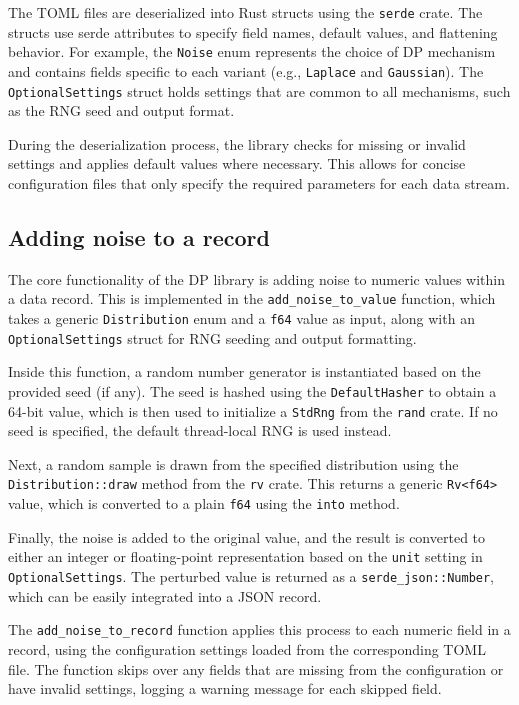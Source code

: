 The TOML files are deserialized into Rust structs using the \texttt{serde} crate. The structs use serde attributes to specify field names, default values, and flattening behavior. For example, the \texttt{Noise} enum represents the choice of DP mechanism and contains fields specific to each variant (e.g., \texttt{Laplace} and \texttt{Gaussian}). The \texttt{OptionalSettings} struct holds settings that are common to all mechanisms, such as the RNG seed and output format.

During the deserialization process, the library checks for missing or invalid settings and applies default values where necessary. This allows for concise configuration files that only specify the required parameters for each data stream.

\subsection{Adding noise to a record}
The core functionality of the DP library is adding noise to numeric values within a data record. This is implemented in the \texttt{add\_noise\_to\_value} function, which takes a generic \texttt{Distribution} enum and a \texttt{f64} value as input, along with an \texttt{OptionalSettings} struct for RNG seeding and output formatting.

Inside this function, a random number generator is instantiated based on the provided seed (if any). The seed is hashed using the \texttt{DefaultHasher} to obtain a 64-bit value, which is then used to initialize a \texttt{StdRng} from the \texttt{rand} crate. If no seed is specified, the default thread-local RNG is used instead.

Next, a random sample is drawn from the specified distribution using the \texttt{Distribution::draw} method from the \texttt{rv} crate. This returns a generic \texttt{Rv<f64>} value, which is converted to a plain \texttt{f64} using the \texttt{into} method.

Finally, the noise is added to the original value, and the result is converted to either an integer or floating-point representation based on the \texttt{unit} setting in \texttt{OptionalSettings}. The perturbed value is returned as a \texttt{serde\_json::Number}, which can be easily integrated into a JSON record.

The \texttt{add\_noise\_to\_record} function applies this process to each numeric field in a record, using the configuration settings loaded from the corresponding TOML file. The function skips over any fields that are missing from the configuration or have invalid settings, logging a warning message for each skipped field.

